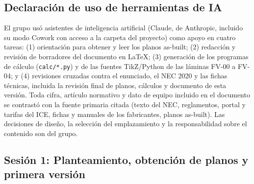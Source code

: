 
\subsection*{Declaración de uso de herramientas de IA}
El grupo usó asistentes de inteligencia artificial (Claude, de Anthropic, incluido su modo Cowork con acceso a la carpeta del proyecto) como apoyo en cuatro tareas: (1) orientación para obtener y leer los planos as-built; (2) redacción y revisión de borradores del documento en \LaTeX{}; (3) generación de los programas de cálculo (\texttt{calc/*.py}) y de las fuentes TikZ/Python de las láminas FV-00 a FV-04; y (4) revisiones cruzadas contra el enunciado, el NEC 2020 y las fichas técnicas, incluida la revisión final de planos, cálculos y documento de esta versión. Toda cifra, artículo normativo y dato de equipo incluido en el documento se contrastó con la fuente primaria citada (texto del NEC, reglamentos, portal y tarifas del ICE, fichas y manuales de los fabricantes, planos as-built). Las decisiones de diseño, la selección del emplazamiento y la responsabilidad sobre el contenido son del grupo.


\subsection*{Sesión 1: Planteamiento, obtención de planos y primera versión}

